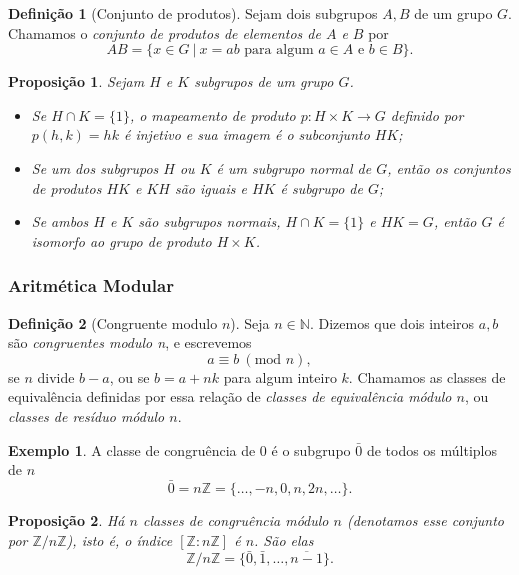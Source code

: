 \documentclass[a4paper,12pt]{report}
\theoremstyle{plain}
\newtheorem{proposicao}{Proposição}[section]
\theoremstyle{definition}
\newtheorem{definicao}{Definição}[section]
\newtheorem{exemplo}{Exemplo}[section]
\begin{document}
\begin{definicao}[Conjunto de produtos]
	Sejam dois subgrupos \(A,B\) de um grupo \(G\).
	Chamamos o \emph{conjunto de produtos de elementos de \(A\) e \(B\)} por
	\[AB = \{x\in G \ | \ x = ab \text{ para algum }a\in A\text{ e }b\in B\}.\]
\end{definicao}

\begin{proposicao}
	Sejam \(H\) e \(K\) subgrupos de um grupo \(G\).
	\begin{itemize}
		\item Se \(H\cap K = \{1\}\), o mapeamento de produto
		\(p: H\times K\longrightarrow G\) definido por \(p(h,k) = hk\) é
		injetivo e sua imagem é o subconjunto \(HK\);
		\item Se um dos subgrupos
		\(H\) ou \(K\) é um subgrupo normal de \(G\), então os conjuntos de
		produtos \(HK\) e \(KH\) são iguais e \(HK\) é subgrupo de \(G\);
		\item Se ambos \(H\) e \(K\) são subgrupos normais, \(H\cap K = \{1\}\) e
		\(HK = G\), então \(G\) é isomorfo ao grupo de produto \(H\times K\).
	\end{itemize}
\end{proposicao}

\subsubsection{Aritmética Modular}

\begin{definicao}[Congruente modulo $n$]
	Seja \(n\in\mathbb{N}\). Dizemos que dois inteiros
	\(a,b\) são \emph{congruentes modulo n}, e escrevemos
	\[ a \equiv b \ (\text{mod }n),\]
	se \(n\) divide \(b-a\), ou se \(b = a + nk\) para algum inteiro \(k\).
	Chamamos as classes de equivalência definidas por essa relação de
	\emph{classes de equivalência módulo \(n\)}, ou \emph{classes de resíduo módulo \(n\)}.	
\end{definicao}

\begin{exemplo}
	A classe de congruência de 0 é o subgrupo \(\bar{0}\)
	de todos os múltiplos de \(n\) \[\bar{0} = n\mathbb{Z} = \{\dots,-n,0,n,2n, \dots\}.\]
\end{exemplo}

\begin{proposicao}
	Há \(n\) classes de congruência módulo \(n\) (denotamos esse conjunto por \(\mathbb{Z}/n\mathbb{Z}\)), isto é, o índice \([\mathbb{Z}:n\mathbb{Z}]\) é \(n\). São elas \[\mathbb{Z}/n\mathbb{Z} =  \{\bar{0}, \bar{1},\dots,\overline{n - 1}\}.\]		
\end{proposicao}
\end{document}
